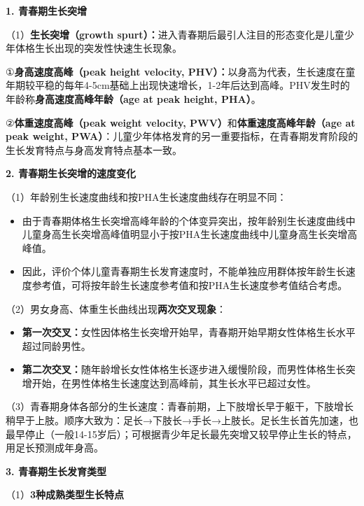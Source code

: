 \begin{keybox}
\textbf{1. 青春期生长突增}

（1）\textbf{生长突增（growth spurt）：}进入青春期后最引人注目的形态变化是儿童少年体格生长出现的突发性快速生长现象。

①\textbf{身高速度高峰（peak height velocity, PHV）：}以身高为代表，生长速度在童年期较平稳的每年4-5cm基础上出现快速增长，1-2年后达到高峰。PHV发生时的年龄称\textbf{身高速度高峰年龄（age at peak height, PHA）}。

②\textbf{体重速度高峰（peak weight velocity, PWV）}和\textbf{体重速度高峰年龄（age at peak weight, PWA）}：儿童少年体格发育的另一重要指标，在青春期发育阶段的生长发育特点与身高发育特点基本一致。

\textbf{2. 青春期生长突增的速度变化}

（1）年龄别生长速度曲线和按PHA生长速度曲线存在明显不同：
\begin{itemize}
    \item 由于青春期体格生长突增高峰年龄的个体变异突出，按年龄别生长速度曲线中儿童身高生长突增高峰值明显小于按PHA生长速度曲线中儿童身高生长突增高峰值。
    \item 因此，评价个体儿童青春期生长发育速度时，不能单独应用群体按年龄生长速度参考值，可将按年龄生长速度参考值和按PHA生长速度参考值结合考虑。
\end{itemize}

（2）男女身高、体重生长曲线出现\textbf{两次交叉现象}：
\begin{itemize}
    \item \textbf{第一次交叉：}女性因体格生长突增开始早，青春期开始早期女性体格生长水平超过同龄男性。
    \item \textbf{第二次交叉：}随年龄增长女性体格生长逐步进入缓慢阶段，而男性体格生长突增开始，在男性体格生长速度达到高峰前，其生长水平已超过女性。
\end{itemize}

（3）青春期身体各部分的生长速度：青春前期，上下肢增长早于躯干，下肢增长稍早于上肢。顺序大致为：足长→下肢长→手长→上肢长。足长生长首先加速，也最早停止（一般14-15岁后）；可根据青少年足长最先突增又较早停止生长的特点，用足长预测成年身高。

\textbf{3. 青春期生长发育类型}

（1）\textbf{3种成熟类型生长特点}


\end{keybox}
